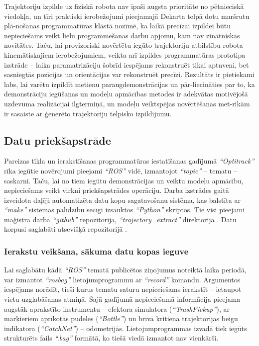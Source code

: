 \documentclass[12pt, a4paper]{article}
\numberwithin{equation}{section} %
\begin{document}
Trajektoriju izpilde uz fiziskā robota nav īpaši augsta prioritāte no pētnieciskā viedokļa, un tīri praktiski ierobežojumi pieejamajā Dekarta telpā dotu maršrutu plā-nošanas programmatūras klāstā nozīmē, ka laikā precīzai izpildei būtu nepieciešams veikt lielu programmēšanas darbu apjomu, kam nav zinātniskās novitātes. Taču, lai provizoriski novērtētu iegūto trajektoriju atbilstību robota kinemātiskajiem ierobežojumiem, veikta arī izpildes programmatūras prototipa izstrāde -- laika paramatrizāciju šobrīd iespējams rekonstruēt tikai aptuveni, bet sasniegtās pozīcijas un orientācijas var rekonstruēt precīzi. Rezultāts ir pietiekami labs, lai varētu izpildīt metienu paraugdemonstrācijas un pār-liecināties par to, ka demonstrāciju iegūšanas un modeļu apmācības metodes ir adekvātas motivējošā uzdevuma realizācijai ilgtermiņā, un modeļu veiktspējas novērtēšanas met-rikām ir sasaiste ar ģenerēto trajektoriju telpisko izpildījumu.

\subsection{Datu priekšapstrāde}

Pareizas tīkla un ierakstīšanas programmatūras iestatīšanas gadījumā \textit{``Optitrack''} rīka iegūtie novērojumi pieejami \textit{``ROS''} vidē, izmantojot \textit{``topic''} -- tematu -- saskarni. Taču, lai no tiem iegūtu demonstrācijas un veiktu modeļu apmācību, nepieciešams veikt virkni priekšapstrādes operāciju. Darba izstrādes gaitā izveidota daļēji automatizēta datu kopu sagatavošanu sistēma, kas balstīta ar \textit{``make''} sistēmas palīdzību secīgi izsauktos \textit{``Python''} skriptos. Tie visi pieejami maģistra darba \textit{``github''} repozitorijā, \textit{``trajectory\_extract''} direktorijā \cite{md_repo}. Datu korpusi saglabāti atsevišķā repozitorijā \cite{md_data_repo}.

\subsubsection{Ierakstu veikšana, sākuma datu kopas ieguve}

Lai saglabātu kādā \textit{``ROS''} tematā publicētos ziņojumus noteiktā laika periodā, var izmantot \textit{``rosbag''} lietojumprogrammu ar \textit{``record''} komandu. Argumentos iespējams norādīt, tieši kurus tematu saturu nepieciešams ierakstīt -- ietaupot vietu uzglabāšanas atmiņā. Šajā gadījumā nepieciešamā informācija pieejama augstāk aprakstīto instrumentu -- efektora simulatora (\textit{``TrashPickup''}), ar marķieriem aprīkotās pudeles (\textit{``Bottle''}) un brīvā kritiena trajektorijas beigu indikatora (\textit{``CatchNet''}) -- odometrijās.  Lietojumprogrammas izvadā tiek iegūts strukturēts fails \textit{``.bag''} formātā, ko tiešā viedā izmantot nav vienkārši.
\end{document}
